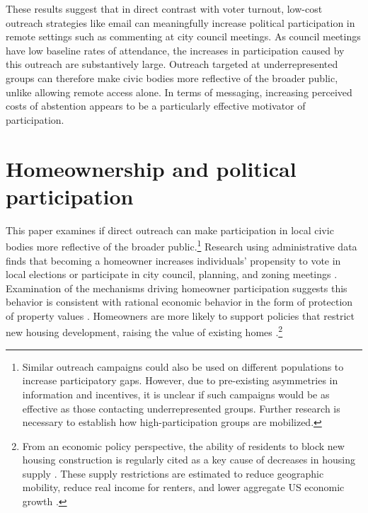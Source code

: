 \documentclass[12pt,final,fleqn]{article}
\theoremstyle{plain}
\begin{document}
These results suggest that in direct contrast with voter turnout, low-cost outreach strategies like email can meaningfully increase political participation in remote settings such as commenting at city council meetings. As council meetings have low baseline rates of attendance, the increases in participation caused by this outreach are substantively large. Outreach targeted at underrepresented groups can therefore make civic bodies more reflective of the broader public, unlike allowing remote access alone. In terms of messaging, increasing perceived costs of abstention appears to be a particularly effective motivator of participation. 


\section{Homeownership and political participation}

This paper examines if direct outreach can make participation in local civic bodies more reflective of the broader public.\footnote{Similar outreach campaigns could also be used on different populations to increase participatory gaps. However, due to pre-existing asymmetries in information and incentives, it is unclear if such campaigns would be as effective as those contacting underrepresented groups. Further research is necessary to establish how high-participation groups are mobilized.} Research using administrative data finds that becoming a homeowner increases individuals' propensity to vote in local elections or participate in city council, planning, and zoning meetings \citep{yoder2020does, hall2018does}. Examination of the mechanisms driving  homeowner participation suggests this behavior is consistent with rational economic behavior in the form of protection of property values \citep{yoder2020does, hall2018does, mccabe2016no, marble2021self}. Homeowners are more likely to support policies that restrict new housing development, raising the value of existing homes \citep{hankinson2018renters, einstein2019participates}.\footnote{From an economic policy perspective, the ability of residents to block new housing construction is regularly cited as a key cause of decreases in housing supply \citep{glaeser2005have}. These supply restrictions are estimated to reduce geographic mobility, reduce real income for renters, and lower aggregate US economic growth \citep{glaeser2018economic, hsieh2019housing}.} 
\end{document}
